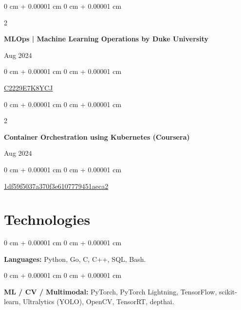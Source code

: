 \documentclass[10pt, letterpaper]{article}
\newenvironment{onecolentry}{
    \begin{adjustwidth}{
        0 cm + 0.00001 cm
    }{
        0 cm + 0.00001 cm
    }
}{
    \end{adjustwidth}
} %
\newenvironment{twocolentry}[2][]{
    \onecolentry
    \def\secondColumn{#2}
    \setcolumnwidth{\fill, 4.5 cm}
    \begin{paracol}{2}
}{
    \switchcolumn \raggedleft \secondColumn
    \end{paracol}
    \endonecolentry
} %
\begin{document}
        \begin{samepage}
            \begin{twocolentry}{
                Aug 2024
            }
                \textbf{MLOps | Machine Learning Operations by Duke University}
            \end{twocolentry}

            \vspace{0.06 cm}
            
            \begin{onecolentry}      
        \href{https://coursera.org/verify/specialization/C2229E7K8YCJ}{C2229E7K8YCJ}
        \end{onecolentry}
        \end{samepage}
\vspace{0.05 cm}
 \begin{samepage}
            \begin{twocolentry}{
                Aug 2024
            }
                \textbf{Container Orchestration using Kubernetes (Coursera)}
            \end{twocolentry}

            \vspace{0.06 cm}
            
            \begin{onecolentry}      
        \href{https://coursera.org/share/1df59f5037a370f3e6107779451aeca2}{1df59f5037a370f3e6107779451aeca2}
        \end{onecolentry}
        \end{samepage}

    \section{Technologies}
        
        \begin{onecolentry}
            \textbf{Languages:} Python, Go, C, C++, SQL, Bash.
        \end{onecolentry}

        \vspace{0.05 cm}

        \begin{onecolentry}
            \textbf{ML / CV / Multimodal:} PyTorch, PyTorch Lightning, TensorFlow, scikit-learn, Ultralytics (YOLO), OpenCV, TensorRT, depthai.
        \end{onecolentry}

        \vspace{0.05 cm}
\end{document}
